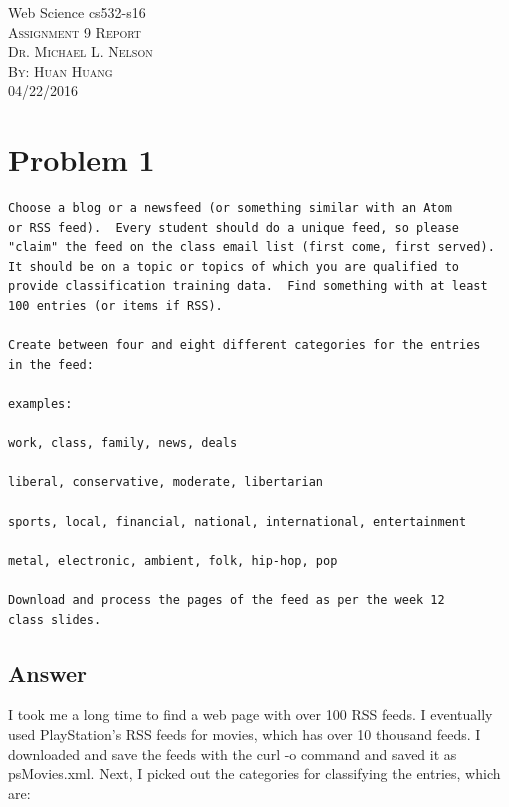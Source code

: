\documentclass[12pt]{article}
\begin{document}
\begin{titlepage}
	\begin{center}
	\Huge{Web Science cs532-s16}\\
	[0.25in]
	\textsc{\Large Assignment 9 Report}\\
	\textsc{\normalsize Dr. Michael L. Nelson}\\
	[4.25in]
	\textsc{\normalsize By: Huan Huang}\\
	\large 04/22/2016\\
	
	
	\end{center}
\end{titlepage}
\newpage



\section*{Problem 1}


\begin{verbatim}
Choose a blog or a newsfeed (or something similar with an Atom
or RSS feed).  Every student should do a unique feed, so please
"claim" the feed on the class email list (first come, first served).
It should be on a topic or topics of which you are qualified to
provide classification training data.  Find something with at least
100 entries (or items if RSS).

Create between four and eight different categories for the entries
in the feed:

examples: 

work, class, family, news, deals

liberal, conservative, moderate, libertarian

sports, local, financial, national, international, entertainment

metal, electronic, ambient, folk, hip-hop, pop

Download and process the pages of the feed as per the week 12 
class slides.
\end{verbatim}

\subsection*{Answer}
I took me a long time to find a web page with over 100 RSS feeds. I eventually used PlayStation's RSS feeds for movies, which has over 10 thousand feeds. I downloaded and save the feeds with the curl -o command and saved it as psMovies.xml. Next, I picked out the categories for classifying the entries, which are:
\end{document}
